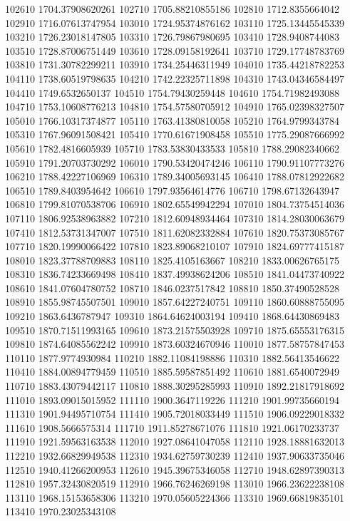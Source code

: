 {102610 1704.37908620261
102710 1705.88210855186
102810 1712.8355664042
102910 1716.07613747954
103010 1724.95374876162
103110 1725.13445545339
103210 1726.23018147805
103310 1726.79867980695
103410 1728.9408744083
103510 1728.87006751449
103610 1728.09158192641
103710 1729.17748783769
103810 1731.30782299211
103910 1734.25446311949
104010 1735.44218782253
104110 1738.60519798635
104210 1742.22325711898
104310 1743.04346584497
104410 1749.6532650137
104510 1754.79430259448
104610 1754.71982493088
104710 1753.10608776213
104810 1754.57580705912
104910 1765.02398327507
105010 1766.10317374877
105110 1763.41380810058
105210 1764.9799343784
105310 1767.96091508421
105410 1770.61671908458
105510 1775.29087666992
105610 1782.4816605939
105710 1783.53830433533
105810 1788.29082340662
105910 1791.20703730292
106010 1790.53420474246
106110 1790.91107773276
106210 1788.42227106969
106310 1789.34005693145
106410 1788.07812922682
106510 1789.8403954642
106610 1797.93564614776
106710 1798.67132643947
106810 1799.81070538706
106910 1802.65549942294
107010 1804.73754514036
107110 1806.92538963882
107210 1812.60948934464
107310 1814.28030063679
107410 1812.53731347007
107510 1811.62082332884
107610 1820.75373085767
107710 1820.19990066422
107810 1823.89068210107
107910 1824.69777415187
108010 1823.37788709883
108110 1825.4105163667
108210 1833.00626765175
108310 1836.74233669498
108410 1837.49938624206
108510 1841.04473740922
108610 1841.07604780752
108710 1846.0237517842
108810 1850.37490528528
108910 1855.98745507501
109010 1857.64227240751
109110 1860.60888755095
109210 1863.6436787947
109310 1864.64624003194
109410 1868.64430869483
109510 1870.71511993165
109610 1873.21575503928
109710 1875.65553176315
109810 1874.64085562242
109910 1873.60324670946
110010 1877.58757847453
110110 1877.9774930984
110210 1882.11084198886
110310 1882.56413546622
110410 1884.00894779459
110510 1885.59587851492
110610 1881.6540072949
110710 1883.43079442117
110810 1888.30295285993
110910 1892.21817918692
111010 1893.09015015952
111110 1900.3647119226
111210 1901.99735660194
111310 1901.94495710754
111410 1905.72018033449
111510 1906.09229018332
111610 1908.5666575314
111710 1911.85278671076
111810 1921.06170233737
111910 1921.59563163538
112010 1927.08641047058
112110 1928.18881632013
112210 1932.66829949538
112310 1934.62759730239
112410 1937.90633735046
112510 1940.41266200953
112610 1945.39675346058
112710 1948.62897390313
112810 1957.32430820519
112910 1966.76246269198
113010 1966.23622238108
113110 1968.15153658306
113210 1970.05605224366
113310 1969.66819835101
113410 1970.23025343108
}
